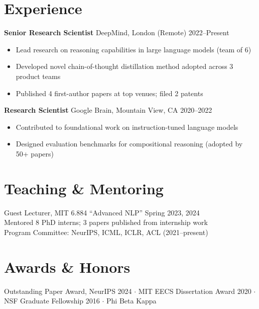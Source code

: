 \documentclass[11pt,a4paper]{article}
\begin{document}
\section{Experience}
\noindent\textbf{Senior Research Scientist} \hfill DeepMind, London (Remote) \hfill 2022--Present
\begin{itemize}[leftmargin=2em,nosep]
\item Lead research on reasoning capabilities in large language models (team of 6)
\item Developed novel chain-of-thought distillation method adopted across 3 product teams
\item Published 4 first-author papers at top venues; filed 2 patents
\end{itemize}
\vspace{0.4em}

\noindent\textbf{Research Scientist} \hfill Google Brain, Mountain View, CA \hfill 2020--2022
\begin{itemize}[leftmargin=2em,nosep]
\item Contributed to foundational work on instruction-tuned language models
\item Designed evaluation benchmarks for compositional reasoning (adopted by 50+ papers)
\end{itemize}

\section{Teaching \& Mentoring}
\noindent Guest Lecturer, MIT 6.884 ``Advanced NLP'' \hfill Spring 2023, 2024\\
Mentored 8 PhD interns; 3 papers published from internship work\\
Program Committee: NeurIPS, ICML, ICLR, ACL (2021--present)

\section{Awards \& Honors}
\noindent Outstanding Paper Award, NeurIPS 2024 $\cdot$ MIT EECS Dissertation Award 2020 $\cdot$ NSF Graduate Fellowship 2016 $\cdot$ Phi Beta Kappa
\end{document}
